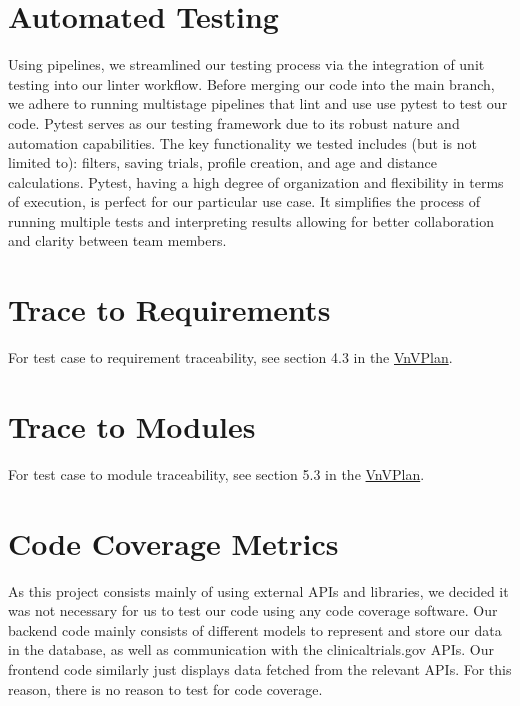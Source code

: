 \documentclass[12pt, titlepage]{article}
\begin{document}
\section{Automated Testing}
Using pipelines, we streamlined our testing process via the integration of unit
testing into our linter workflow. Before merging our code into the main branch, we adhere
to running multistage pipelines that lint and use use pytest to test our code.
Pytest serves as our testing framework
due to its robust nature and automation capabilities. The key functionality we tested includes (but is not limited to):
filters, saving trials, profile creation, and age and distance calculations. Pytest, having a high degree of organization and flexibility
in terms of execution, is perfect
for our particular use case. It simplifies the process of running multiple tests and interpreting results
allowing for better collaboration and clarity between team members.


\section{Trace to Requirements}

For test case to requirement traceability, see section 4.3 in the \href{https://github.com/davimang/REACH/blob/main/docs/VnVPlan/VnVPlan.pdf}{VnVPlan}.
\section{Trace to Modules}
For test case to module traceability, see section 5.3 in the \href{https://github.com/davimang/REACH/blob/main/docs/VnVPlan/VnVPlan.pdf}{VnVPlan}.

\section{Code Coverage Metrics}

As this project consists mainly of using external APIs and libraries, we decided it was not necessary
for us to test our code using any code coverage software. Our backend code mainly consists of different
models to represent and store our data in the database, as well as communication with the clinicaltrials.gov APIs.
Our frontend code similarly just displays data fetched from the relevant APIs. For this reason, there is no
reason to test for code coverage.


%

\newpage{}
\end{document}
